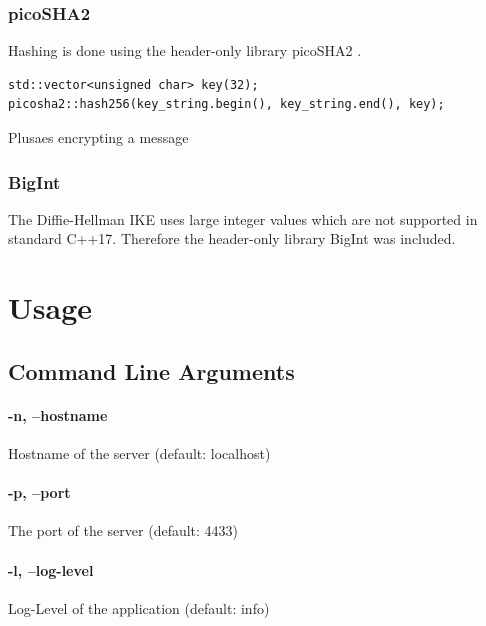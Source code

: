 \documentclass[12pt, letterpaper]{article}
\newenvironment{code}{\captionsetup{type=listing}}{}
\begin{document}
\subsubsection{picoSHA2}
Hashing is done using the header-only library picoSHA2 \cite{picosha}.

\begin{code}
	\begin{verbatim}
std::vector<unsigned char> key(32);
picosha2::hash256(key_string.begin(), key_string.end(), key);
	\end{verbatim}
	\caption{Plusaes encrypting a message}
	\label{picosha2}
\end{code}

\subsubsection{BigInt}
The Diffie-Hellman IKE uses large integer values which are not supported in standard C++17. Therefore the header-only library BigInt \cite{bigint} was included.


\section{Usage}
\label{usage}

\subsection{Command Line Arguments}

\paragraph{-n, --hostname}
Hostname of the server (default: localhost)


\paragraph{-p, --port}
The port of the server (default: 4433)

\paragraph{-l, --log-level}
Log-Level of the application (default: info)
\end{document}
